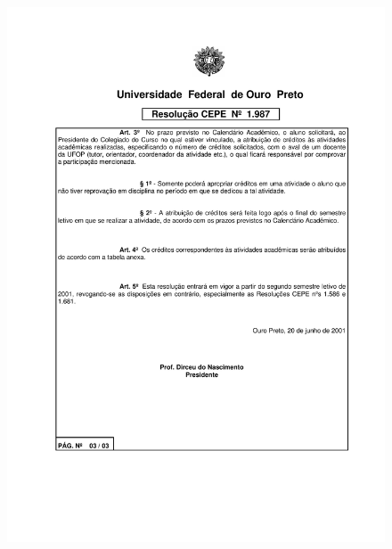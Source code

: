 \begin{figure}[p]
	\centering 
	\includegraphics[scale=0.7]{capitulos/resolucoes/cepe1987/cepe1987-3.pdf}
\end{figure} \pagebreak


